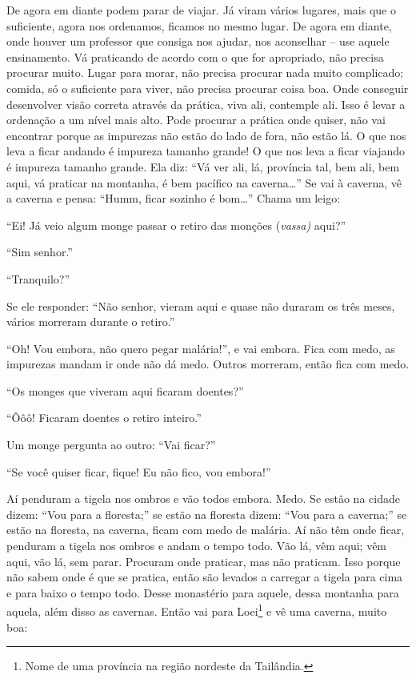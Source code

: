 De agora em diante podem parar de viajar. Já viram vários lugares,
mais que o suficiente, agora nos ordenamos, ficamos no mesmo lugar. De
agora em diante, onde houver um professor que consiga nos ajudar, nos
aconselhar – use aquele ensinamento. Vá praticando de acordo com o que
for apropriado, não precisa procurar muito. Lugar para morar, não
precisa procurar nada muito complicado; comida, só o suficiente para
viver, não precisa procurar coisa boa. Onde conseguir desenvolver visão
correta através da prática, viva ali, contemple ali. Isso é levar a
ordenação a um nível mais alto. Pode procurar a prática onde quiser,
não vai encontrar porque as impurezas não estão do lado de fora, não
estão lá. O que nos leva a ficar andando é impureza tamanho grande! O
que nos leva a ficar viajando é impureza tamanho grande. Ela diz: “Vá
ver ali, lá, província tal, bem ali, bem aqui, vá praticar na montanha,
é bem pacífico na caverna\ldots{}” Se vai à caverna, vê a caverna e pensa:
“Humm, ficar sozinho é bom\ldots{}” Chama um leigo: 

“Ei! Já veio algum monge passar o retiro das monções (\emph{vassa)
}aqui?”

“Sim senhor.” 

“Tranquilo?” 

Se ele responder: “Não senhor, vieram aqui e quase não duraram os
três meses, vários morreram durante o retiro.” 

“Oh! Vou embora, não quero pegar malária!”, e vai embora. Fica com
medo, as impurezas mandam ir onde não dá medo. Outros morreram, então
fica com medo. 

“Os monges que viveram aqui ficaram doentes?” 

“Ôôô! Ficaram doentes o retiro inteiro.”

Um monge pergunta ao outro: “Vai ficar?” 

“Se você quiser ficar, fique! Eu não fico, vou embora!”

Aí penduram a tigela nos ombros e vão todos embora. Medo. Se estão
na cidade dizem: “Vou para a floresta;” se estão na floresta dizem:
“Vou para a caverna;” se estão na floresta, na caverna, ficam com medo
de malária. Aí não têm onde ficar, penduram a tigela nos ombros e andam
o tempo todo. Vão lá, vêm aqui; vêm aqui, vão lá, sem parar. Procuram
onde praticar, mas não praticam. Isso porque não sabem onde é que se
pratica, então são levados a carregar a tigela para cima e para baixo o
tempo todo. Desse monastério para aquele, dessa montanha para aquela,
além disso as cavernas. Então vai para Loei\footnote{Nome de uma
província na região nordeste da Tailândia.} e vê uma caverna, muito
boa: 

